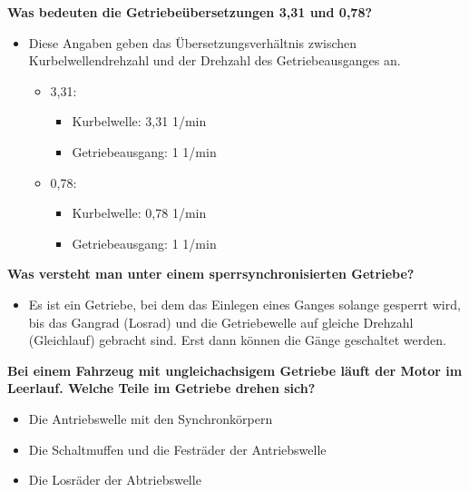 \textbf{Was bedeuten die Getriebeübersetzungen 3,31 und 0,78?}

\begin{itemize}
\item
  Diese Angaben geben das Übersetzungsverhältnis zwischen
  Kurbelwellendrehzahl und der Drehzahl des Getriebeausganges an.

  \begin{itemize}
  \item
    3,31:

    \begin{itemize}
    \item
      Kurbelwelle: 3,31 1/min
    \item
      Getriebeausgang: 1 1/min
    \end{itemize}
  \item
    0,78:

    \begin{itemize}
    \item
      Kurbelwelle: 0,78 1/min
    \item
      Getriebeausgang: 1 1/min
    \end{itemize}
  \end{itemize}
\end{itemize}

\textbf{Was versteht man unter einem sperrsynchronisierten Getriebe?}

\begin{itemize}
\item
  Es ist ein Getriebe, bei dem das Einlegen eines Ganges solange
  gesperrt wird, bis das Gangrad (Losrad) und die Getriebewelle auf
  gleiche Drehzahl (Gleichlauf) gebracht sind. Erst dann können die
  Gänge geschaltet werden.
\end{itemize}

\textbf{Bei einem Fahrzeug mit ungleichachsigem Getriebe läuft der Motor
im Leerlauf. Welche Teile im Getriebe drehen sich?}

\begin{itemize}
\item
  Die Antriebswelle mit den Synchronkörpern
\item
  Die Schaltmuffen und die Festräder der Antriebswelle
\item
  Die Losräder der Abtriebswelle
\end{itemize}
